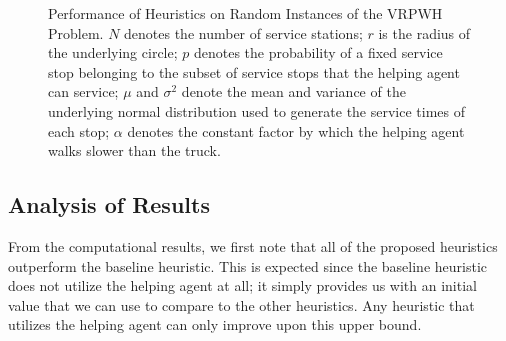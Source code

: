 \documentclass[12pt]{scrartcl}
\begin{document}
\begin{figure}[H]
\begin{longtable}{|c|c|c|c|c|c|c|c|c|c|c|}
 \iffalse
 $75$ & $1$ & $0$ & $5$ & $1$ & $\frac{4}{3}$ & $43.829$ & $26.052$ & $57.642$ & $33.586$ & $24.999$ \\
 \hline
 $75$ & $1$ & $0.25$ & $5$ & $1$ & $\frac{4}{3}$ & $43.905$ & $26.111$ & $24.342$ & $23.610$ & $21.067$ \\
 \hline
  $75$ & $1$ & $0.50$ & $5$ & $1$ & $\frac{4}{3}$ &  $43.905$ & $26.261$ & $25.342$ & $23.614$ & $21.069$ \\
 \hline
 $75$ & $1$ & $0.75$ & $5$ & $1$ & $\frac{4}{3}$ & $43.904$ & $26.923$ & $25.276$ & $23.567$ & $21.109$ \\
  \hline
 $75$ & $1$ & $1$ & $5$ & $1$ & $\frac{4}{3}$ & $43.855$ & $26.051$ & $24.012$ & $23.535$ & $21.079$ \\
 \hline
 $100$ & $1$ & $0$ & $10$ & $1$ & $\infty$ & $83.617$ & $36.012$ & $34.924$ & $32.691$ & $34.950$ \\
 \hline
 $100$ & $1$ & $0.25$ & $10$ & $1$ & $\infty$ & $83.783$ & $35.241$ & $32.792$ & $34.155$ & $33.826$ \\
 \hline
 $100$ & $1$ & $0.50$ & $10$ & $1$ & $\infty$ & $83.698$ & $35.012$ & $31.461$ & $33.950$ & $32.891$ \\
 \hline
 $100$ & $1$ & $0.75$ & $10$ & $1$ & $\infty$ & $83.698$ & $35.212$ & $31.421$ & $32.945$ & $27.121$ \\
 \hline
 $100$ & $1$ & $1$ & $10$  & $1$ & $\infty$ & $78.746$ & $29.521$ & $28.192$ & $43.421$ & $30.991$ \\
 \hline
 \fi

 \end{longtable}  
 \caption{Performance of Heuristics on Random Instances of the VRPWH Problem. $N$ denotes the number of service stations; $r$ is the radius of the underlying circle; $p$ denotes the probability of a fixed service stop belonging to the subset of service stops that the helping agent can service; $\mu$ and $\sigma^2$ denote the mean and variance of the underlying normal distribution used to generate the service times of each stop; $\alpha$ denotes the constant factor by which the helping agent walks slower than the truck.}
\end{figure}

\subsection{Analysis of Results}

From the computational results, we first note that all of the proposed heuristics outperform the baseline heuristic. This is expected since the baseline heuristic does not utilize the helping agent at all; it simply provides us with an initial value that we can use to compare to the other heuristics. Any heuristic that utilizes the helping agent can only improve upon this upper bound. \\
\end{document}
